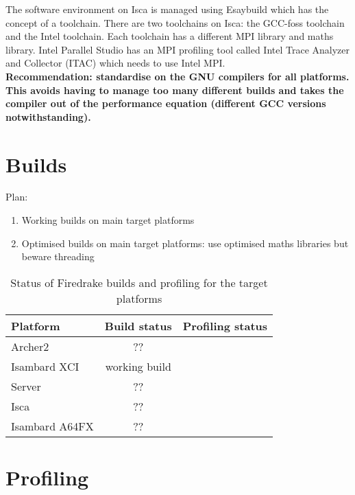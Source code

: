 \documentclass[a4paper,titlepage]{article}
\begin{document}
The software environment on Isca is managed using Esaybuild which has the concept of a toolchain. There are two toolchains on Isca: the GCC-foss toolchain and the Intel toolchain. Each toolchain has a different MPI library and maths library. Intel Parallel Studio has an MPI profiling tool called Intel Trace Analyzer and Collector (ITAC) which needs to use Intel MPI. \\

\noindent
\textbf{Recommendation: standardise on the GNU compilers for all platforms. This avoids having to manage too many different builds and takes the compiler out of the performance equation (different GCC versions notwithstanding).}

\section{Builds}

Plan:
\begin{enumerate}
\item Working builds on main target platforms
\item Optimised builds on main target platforms: use optimised maths libraries but beware threading
\end{enumerate}
%

\begin{table}[htp]
\begin{center}
\begin{tabular}{|l|c|c|}
\hline
Platform       &  Build status     & Profiling status \\
\hline
Archer2        &  ??               & \\
Isambard XCI   &  working build    & \\
Server         &  ??               & \\
Isca           &  ??               & \\
Isambard A64FX &  ??               & \\
\hline
\end{tabular}
\end{center}
\caption{Status of Firedrake builds and profiling for the target platforms}
\label{default}
\end{table}%




\section{Profiling}
\end{document}
